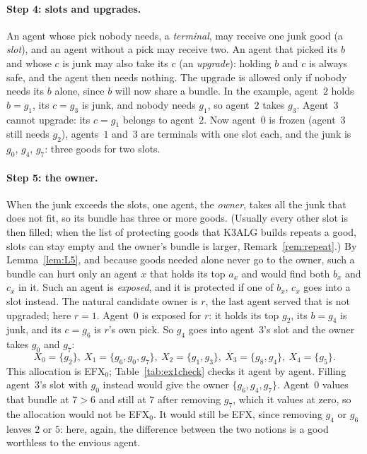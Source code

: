 \documentclass[runningheads,11pt]{llncs}
\newcommand{\efxz}{\texorpdfstring{\mbox{EFX$_0$}}{EFX0}}
\begin{document}
\paragraph{Step 4: slots and upgrades.} An agent whose pick nobody needs, a \emph{terminal}, may receive one junk good (a \emph{slot}), and an agent without a pick may receive two. An agent that picked its $b$ and whose $c$ is junk may also take its $c$ (an \emph{upgrade}): holding $b$ and $c$ is always safe, and the agent then needs nothing. The upgrade is allowed only if nobody needs its $b$ alone, since $b$ will now share a bundle. In the example, agent~$2$ holds $b=g_1$, its $c=g_3$ is junk, and nobody needs $g_1$, so agent~$2$ takes $g_3$. Agent~$3$ cannot upgrade: its $c=g_1$ belongs to agent~$2$. Now agent~$0$ is frozen (agent~$3$ still needs $g_2$), agents~$1$ and~$3$ are terminals with one slot each, and the junk is $g_0$, $g_4$, $g_7$: three goods for two slots.

\paragraph{Step 5: the owner.} When the junk exceeds the slots, one agent, the \emph{owner}, takes all the junk that does not fit, so its bundle has three or more goods. (Usually every other slot is then filled; when the list of protecting goods that K3ALG builds repeats a good, slots can stay empty and the owner's bundle is larger, Remark~\ref{rem:repeat}.) By Lemma~\ref{lem:L5}, and because goods needed alone never go to the owner, such a bundle can hurt only an agent $x$ that holds its top $a_x$ and would find both $b_x$ and $c_x$ in it. Such an agent is \emph{exposed}, and it is protected if one of $b_x$, $c_x$ goes into a slot instead. The natural candidate owner is $r$, the last agent served that is not upgraded; here $r=1$. Agent~$0$ is exposed for $r$: it holds its top $g_2$, its $b=g_4$ is junk, and its $c=g_6$ is $r$'s own pick. So $g_4$ goes into agent~$3$'s slot and the owner takes $g_0$ and $g_7$:
\[
X_0=\{g_2\},\ X_1=\{g_6,g_0,g_7\},\ X_2=\{g_1,g_3\},\ X_3=\{g_8,g_4\},\ X_4=\{g_5\}.
\]
This allocation is \efxz{}; Table~\ref{tab:ex1check} checks it agent by agent. Filling agent~$3$'s slot with $g_0$ instead would give the owner $\{g_6,g_4,g_7\}$. Agent~$0$ values that bundle at $7>6$ and still at $7$ after removing $g_7$, which it values at zero, so the allocation would not be \efxz{}. It would still be EFX, since removing $g_4$ or $g_6$ leaves $2$ or $5$: here, again, the difference between the two notions is a good worthless to the envious agent.
\end{document}
